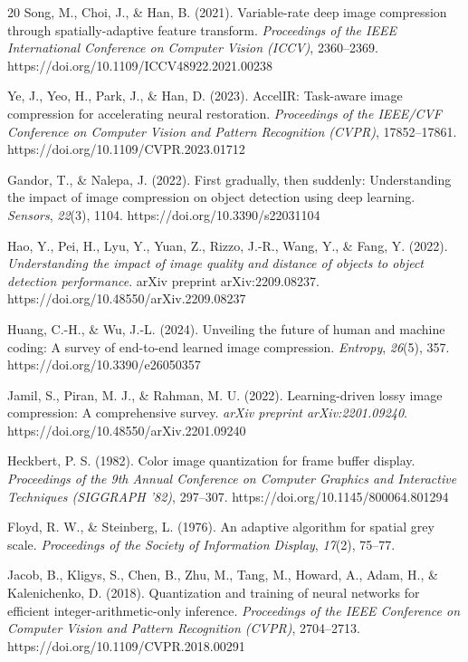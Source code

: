 \documentclass[12pt, a4paper]{article}
\begin{document}
\begin{thebibliography}{20}
Song, M., Choi, J., \& Han, B. (2021). Variable-rate deep image compression through spatially-adaptive feature transform. \textit{Proceedings of the IEEE International Conference on Computer Vision (ICCV)}, 2360–2369. https://doi.org/10.1109/ICCV48922.2021.00238

Ye, J., Yeo, H., Park, J., \& Han, D. (2023). AccelIR: Task-aware image compression for accelerating neural restoration. \textit{Proceedings of the IEEE/CVF Conference on Computer Vision and Pattern Recognition (CVPR)}, 17852–17861. https://doi.org/10.1109/CVPR.2023.01712

Gandor, T., \& Nalepa, J. (2022). First gradually, then suddenly: Understanding the impact of image compression on object detection using deep learning. \textit{Sensors}, \textit{22}(3), 1104. https://doi.org/10.3390/s22031104

Hao, Y., Pei, H., Lyu, Y., Yuan, Z., Rizzo, J.-R., Wang, Y., \& Fang, Y. (2022). \textit{Understanding the impact of image quality and distance of objects to object detection performance}. arXiv preprint arXiv:2209.08237. https://doi.org/10.48550/arXiv.2209.08237

Huang, C.-H., \& Wu, J.-L. (2024). Unveiling the future of human and machine coding: A survey of end-to-end learned image compression. \textit{Entropy}, \textit{26}(5), 357. https://doi.org/10.3390/e26050357

Jamil, S., Piran, M. J., \& Rahman, M. U. (2022). Learning-driven lossy image compression: A comprehensive survey. \textit{arXiv preprint arXiv:2201.09240}. https://doi.org/10.48550/arXiv.2201.09240

Heckbert, P. S. (1982). Color image quantization for frame buffer display. \textit{Proceedings of the 9th Annual Conference on Computer Graphics and Interactive Techniques (SIGGRAPH ’82)}, 297–307. https://doi.org/10.1145/800064.801294

Floyd, R. W., \& Steinberg, L. (1976). An adaptive algorithm for spatial grey scale. \textit{Proceedings of the Society of Information Display}, \textit{17}(2), 75–77.

Jacob, B., Kligys, S., Chen, B., Zhu, M., Tang, M., Howard, A., Adam, H., \& Kalenichenko, D. (2018). Quantization and training of neural networks for efficient integer-arithmetic-only inference. \textit{Proceedings of the IEEE Conference on Computer Vision and Pattern Recognition (CVPR)}, 2704–2713. https://doi.org/10.1109/CVPR.2018.00291


\end{thebibliography}
\end{document}

